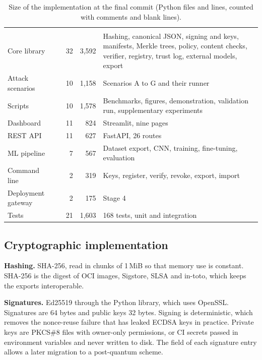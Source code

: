 {\tablefont
\begin{xltabular}{\textwidth}{P{3.0cm}P{2.2cm}rrL}
\caption{Size of the implementation at the final commit (Python files and lines, counted with comments and blank lines).}\label{tab:code}\\
\toprule
\headrow{} &  &  &  &  \\
\midrule
\endfirsthead
\toprule
\headrow{} &  &  &  &  \\
\midrule
\endhead
\bottomrule
\endfoot
Core library &  & 32 & 3,592 & Hashing, canonical JSON, signing and keys, manifests, Merkle trees, policy, content checks, verifier, registry, trust log, external models, export \\
Attack scenarios &  & 10 & 1,158 & Scenarios A to G and their runner \\
Scripts &  & 10 & 1,578 & Benchmarks, figures, demonstration, validation run, supplementary experiments \\
Dashboard &  & 11 & 824 & Streamlit, nine pages \\
REST API &  & 11 & 627 & FastAPI, 26 routes \\
ML pipeline &  & 7 & 567 & Dataset export, CNN, training, fine-tuning, evaluation \\
Command line &  & 2 & 319 & Keys, register, verify, revoke, export, import \\
Deployment gateway &  & 2 & 175 & Stage 4 \\
\midrule
Tests &  & 21 & 1,603 & 168 tests, unit and integration \\
\end{xltabular}}

\subsection{Cryptographic implementation}
\textbf{Hashing.} SHA-256, read in chunks of 1\,MiB so that memory use is constant. SHA-256 is the digest of
OCI images, Sigstore, SLSA and in-toto, which keeps the exports interoperable.

\textbf{Signatures.} Ed25519 through the Python  library, which uses OpenSSL. Signatures are
64 bytes and public keys 32 bytes. Signing is deterministic, which removes the nonce-reuse failure that has
leaked ECDSA keys in practice. Private keys are PKCS\#8 files with owner-only permissions, or CI secrets passed
in environment variables and never written to disk. The  field of each signature entry allows a
later migration to a post-quantum scheme.

